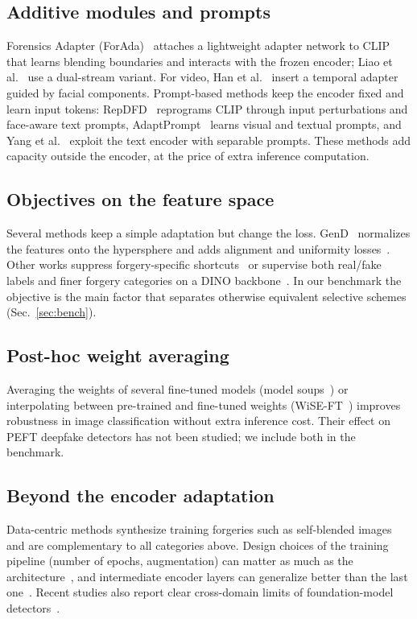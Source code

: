 \documentclass[fonts]{icst}
\begin{document}
\subsection{Additive modules and prompts}
Forensics Adapter (ForAda)~\cite{cui2025forada} attaches a lightweight adapter network to CLIP that learns blending boundaries and interacts with the frozen encoder; Liao et al.~\cite{liao2026dfa} use a dual-stream variant. For video, Han et al.~\cite{han2024fcg} insert a temporal adapter guided by facial components. Prompt-based methods keep the encoder fixed and learn input tokens: RepDFD~\cite{lin2025repdfd} reprograms CLIP through input perturbations and face-aware text prompts, AdaptPrompt~\cite{jiang2026adaptprompt} learns visual and textual prompts, and Yang et al.~\cite{yang2026separable} exploit the text encoder with separable prompts. These methods add capacity outside the encoder, at the price of extra inference computation.

\subsection{Objectives on the feature space}
Several methods keep a simple adaptation but change the loss. GenD~\cite{yermakov2025gend} normalizes the features onto the hypersphere and adds alignment and uniformity losses~\cite{wang2020alignment}. Other works suppress forgery-specific shortcuts~\cite{wang2026shortcut} or supervise both real/fake labels and finer forgery categories on a DINO backbone~\cite{zhang2026dino}. In our benchmark the objective is the main factor that separates otherwise equivalent selective schemes (Sec.~\ref{sec:bench}).

\subsection{Post-hoc weight averaging}
Averaging the weights of several fine-tuned models (model soups~\cite{wortsman2022soups}) or interpolating between pre-trained and fine-tuned weights (WiSE-FT~\cite{wortsman2022wiseft}) improves robustness in image classification without extra inference cost. Their effect on PEFT deepfake detectors has not been studied; we include both in the benchmark.

\subsection{Beyond the encoder adaptation}
Data-centric methods synthesize training forgeries such as self-blended images~\cite{shiohara2022sbi,chen2022sladd,lin2024cdfa} and are complementary to all categories above. Design choices of the training pipeline (number of epochs, augmentation) can matter as much as the architecture~\cite{pellegrini2025design}, and intermediate encoder layers can generalize better than the last one~\cite{park2025mold}. Recent studies also report clear cross-domain limits of foundation-model detectors~\cite{delibasoglu2026limits}.
\end{document}
